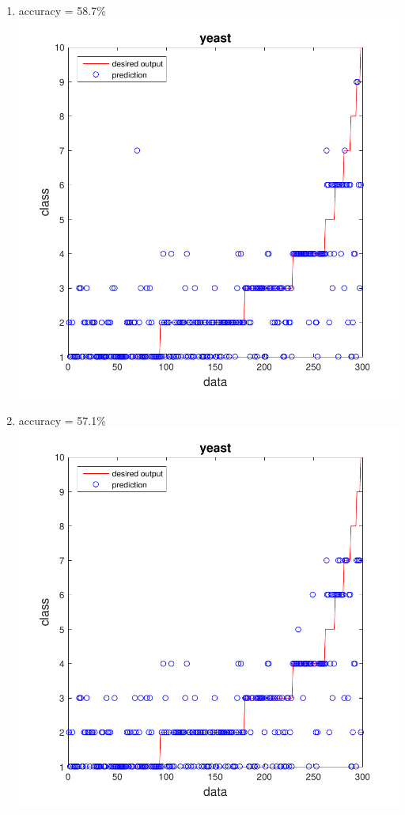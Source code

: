 \documentclass[12pt,a4paper]{article}
\begin{document}
\begin{CJK}{UTF8}{bsmi}
\begin{enumerate}
\begin{enumerate}
\begin{enumerate}
\begin{enumerate}
			\newpage	
			\item accuracy = 58.7\%\ \\
			\includegraphics[scale=0.6]{yeasths2}	
			\item accuracy = 57.1\%\ \\
			\includegraphics[scale=0.6]{yeasths3}		
			\newpage	
		\end{enumerate}
	\end{enumerate}
	

\end{enumerate}
\end{enumerate}
\end{CJK}
\end{document}
